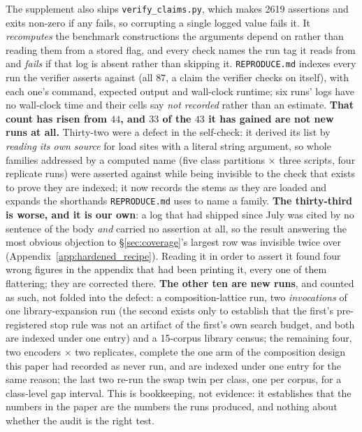 The supplement also ships \texttt{verify\_claims.py}, which makes 2619 assertions and exits non-zero if any fails, so corrupting a single logged value fails it. It \emph{recomputes} the benchmark constructions the arguments depend on rather than reading them from a stored flag, and every check names the run tag it reads from and \emph{fails} if that log is absent rather than skipping it. \texttt{REPRODUCE.md} indexes every run the verifier asserts against (all $87$, a claim the verifier checks on itself), with each one's command, expected output and wall-clock runtime; six runs' logs have no wall-clock time and their cells say \emph{not recorded} rather than an estimate. \textbf{That count has risen from $44$, and $33$ of the $43$ it has gained are not new runs at all.} Thirty-two were a defect in the self-check: it derived its list by \emph{reading its own source} for load sites with a literal string argument, so whole families addressed by a computed name (five class partitions $\times$ three scripts, four replicate runs) were asserted against while being invisible to the check that exists to prove they are indexed; it now records the stems as they are loaded and expands the shorthands \texttt{REPRODUCE.md} uses to name a family. \textbf{The thirty-third is worse, and it is our own}: a log that had shipped since July was cited by no sentence of the body \emph{and} carried no assertion at all, so the result answering the most obvious objection to \S\ref{sec:coverage}'s largest row was invisible twice over (Appendix~\ref{app:hardened_recipe}). Reading it in order to assert it found four wrong figures in the appendix that had been printing it, every one of them flattering; they are corrected there. \textbf{The other ten are new runs}, and counted as such, not folded into the defect: a composition-lattice run, two \emph{invocations} of one library-expansion run (the second exists only to establish that the first's pre-registered stop rule was not an artifact of the first's own search budget, and both are indexed under one entry) and a 15-corpus library census; the remaining four, two encoders $\times$ two replicates, complete the one arm of the composition design this paper had recorded as never run, and are indexed under one entry for the same reason; the last two re-run the swap twin per class, one per corpus, for a class-level gap interval. This is bookkeeping, not evidence: it establishes that the numbers in the paper are the numbers the runs produced, and nothing about whether the audit is the right test.

